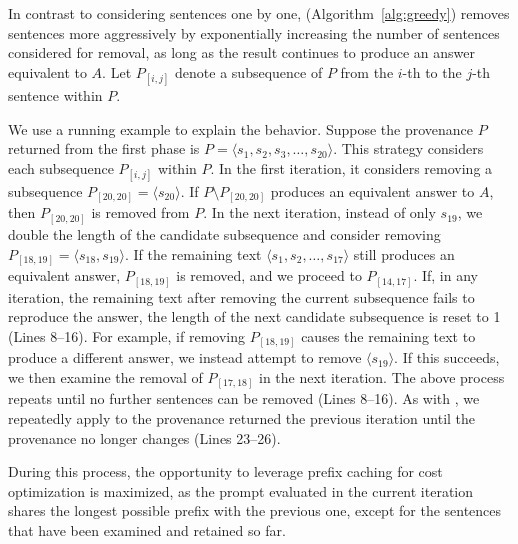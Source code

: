 In contrast to considering sentences one by one,  (Algorithm~\ref{alg:greedy}) removes sentences more aggressively by exponentially increasing the number of sentences considered for removal, as long as the result  continues to produce an answer equivalent to $A$. Let $P_{[i,j]}$ denote a subsequence of $P$ from the $i$-th to the $j$-th sentence within $P$. 

We use a running example to explain the behavior. Suppose the provenance $P$ returned from the first phase is $P = \langle s_1, s_2, s_3, \dots, s_{20} \rangle$. This strategy considers each subsequence $P_{[i,j]}$ within $P$. In the first iteration, it considers removing a subsequence $P_{[20,20]} = \langle s_{20} \rangle$.  If $P \setminus P_{[20,20]}$ produces an equivalent answer to $A$, then $P_{[20,20]}$ is removed from $P$. In the next iteration, instead of only $s_{19}$, we double the length of the candidate subsequence and consider removing $P_{[18,19]} = \langle s_{18}, s_{19}\rangle$. If the remaining text $\langle s_1, s_2, \dots, s_{17} \rangle$ still produces an equivalent answer, $P_{[18,19]}$ is removed, and we proceed to $P_{[14,17]}$. If, in any iteration, the remaining text after removing the current subsequence fails to reproduce the answer, the length of the next candidate subsequence is reset to 1 (Lines 8–16). For example, if removing $P_{[18,19]}$ causes the remaining text to produce a different answer, we instead attempt to remove $\langle s_{19} \rangle$. If this succeeds, we then examine the removal of $P_{[17,18]}$ in the next iteration.  The above process repeats until no further sentences can be removed (Lines 8–16). As with , we repeatedly apply  to the provenance returned the previous iteration until the provenance no longer changes (Lines 23–26). %

During this process, the opportunity to leverage prefix caching for cost optimization is maximized, as the prompt evaluated in the current iteration shares the longest possible prefix with the previous one, except for the sentences that have been examined and retained so far. 




